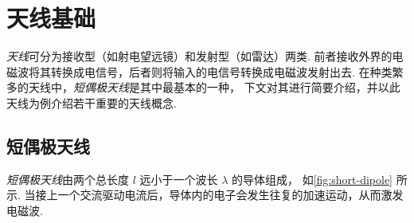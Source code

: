 \section{天线基础}
\label{sec:antenna}

\emph{天线}可分为接收型（如射电望远镜）和发射型（如雷达）两类.
前者接收外界的电磁波将其转换成电信号，后者则将输入的电信号转换成电磁波发射出去.
在种类繁多的天线中，\emph{短偶极天线}是其中最基本的一种，
下文对其进行简要介绍，并以此天线为例介绍若干重要的天线概念.

\subsection{短偶极天线}

\emph{短偶极天线}由两个总长度 $l$ 远小于一个波长 $\lambda$ 的导体组成，
如\autoref{fig:short-dipole} 所示.
当接上一个交流驱动电流后，导体内的电子会发生往复的加速运动，从而激发电磁波.

